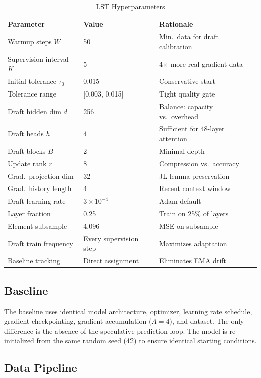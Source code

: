 \documentclass[conference]{IEEEtran}
\begin{document}
\begin{table}[h]
\centering
\caption{LST Hyperparameters}
\label{tab:lst_config}
\begin{tabular}{@{}lll@{}}
\toprule
\textbf{Parameter} & \textbf{Value} & \textbf{Rationale} \\
\midrule
Warmup steps $W$ & 50 & Min.\ data for draft calibration \\
Supervision interval $K$ & 5 & 4$\times$ more real gradient data \\
Initial tolerance $\tau_0$ & 0.015 & Conservative start \\
Tolerance range & [0.003, 0.015] & Tight quality gate \\
Draft hidden dim $d$ & 256 & Balance: capacity vs.\ overhead \\
Draft heads $h$ & 4 & Sufficient for 48-layer attention \\
Draft blocks $B$ & 2 & Minimal depth \\
Update rank $r$ & 8 & Compression vs.\ accuracy \\
Grad.\ projection dim & 32 & JL-lemma preservation \\
Grad.\ history length & 4 & Recent context window \\
Draft learning rate & $3 \times 10^{-4}$ & Adam default \\
Layer fraction & 0.25 & Train on 25\% of layers \\
Element subsample & 4,096 & MSE on subsample \\
Draft train frequency & Every supervision step & Maximizes adaptation \\
Baseline tracking & Direct assignment & Eliminates EMA drift \\
\bottomrule
\end{tabular}
\end{table}

\subsection{Baseline}

The baseline uses identical model architecture, optimizer, learning rate schedule, gradient checkpointing, gradient accumulation ($A = 4$), and dataset. The only difference is the absence of the speculative prediction loop. The model is re-initialized from the same random seed (42) to ensure identical starting conditions.

\subsection{Data Pipeline}
\end{document}
